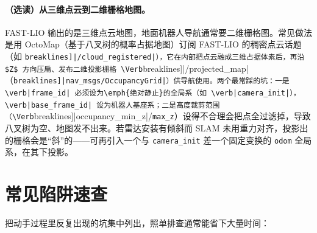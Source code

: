 \paragraph{（选读）从三维点云到二维栅格地图。}FAST-LIO 输出的是三维点云地图，地面机器人导航通常要二维栅格图。常见做法是用 OctoMap\cite{hornung2013octomap}（基于八叉树的概率占据地图）订阅 FAST-LIO 的稠密点云话题（如 \Verb[breaklines]|/cloud_registered|），它在内部把点云融成三维占据体素后，再沿 $Z$ 方向压扁、发布二维投影栅格 \Verb[breaklines]|/projected_map|（\Verb[breaklines]|nav_msgs/OccupancyGrid|）供导航使用。两个最常踩的坑：一是 \verb|frame_id| 必须设为\emph{绝对静止}的全局系（如 \verb|camera_init|），\verb|base_frame_id| 设为机器人基座系；二是高度裁剪范围（\Verb[breaklines]|occupancy_min_z|/\allowbreak\verb|max_z|）设得不合理会把点全过滤掉，导致八叉树为空、地图发不出来。若雷达安装有倾斜而 SLAM 未用重力对齐，投影出的栅格会是“斜”的——可再引入一个与 \verb|camera_init| 差一个固定变换的 \verb|odom| 全局系，在其下投影。

\section{常见陷阱速查}

把动手过程里反复出现的坑集中列出，照单排查通常能省下大量时间：

